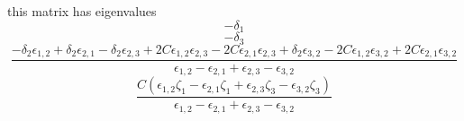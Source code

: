 \documentclass[12pt,a4paper]{exam}
\begin{document}
this matrix has eigenvalues
\[
    -\delta_1
\]
\[
    -\delta_3
\]
\[
    \frac{-\delta_2 \epsilon_{1,2} + \delta_2 \epsilon_{2,1} - \delta_2 \epsilon_{2,3} + 2 C \epsilon_{1,2} \epsilon_{2,3} - 2 C \epsilon_{2,1} \epsilon_{2,3} + \delta_2 \epsilon_{3,2} - 2 C \epsilon_{1,2} \epsilon_{3,2} + 2 C \epsilon_{2,1} \epsilon_{3,2}}{\epsilon_{1,2} - \epsilon_{2,1} + \epsilon_{2,3} - \epsilon_{3,2}}
\]
\[
    \frac{C (\epsilon_{1,2} \zeta_1 - \epsilon_{2,1} \zeta_1 + \epsilon_{2,3} \zeta_3 - \epsilon_{3,2} \zeta_3)}{\epsilon_{1,2} - \epsilon_{2,1} + \epsilon_{2,3} - \epsilon_{3,2}}
\]
\end{document}
